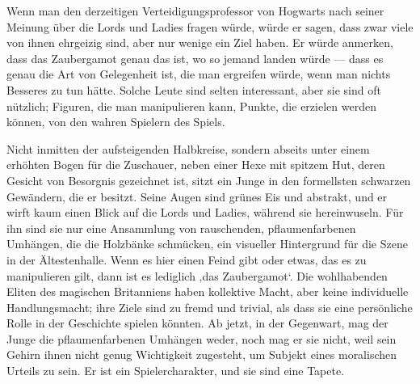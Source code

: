 Wenn man den derzeitigen Verteidigungsprofessor von Hogwarts nach seiner Meinung über die Lords und Ladies fragen würde, würde er sagen, dass zwar viele von ihnen ehrgeizig sind, aber nur wenige ein Ziel haben. Er würde anmerken, dass das Zaubergamot genau das ist, wo so jemand landen würde — dass es genau die Art von Gelegenheit ist, die man ergreifen würde, wenn man nichts Besseres zu tun hätte. Solche Leute sind selten interessant, aber sie sind oft nützlich; Figuren, die man manipulieren kann, Punkte, die erzielen werden können, von den wahren Spielern des Spiels.

Nicht inmitten der aufsteigenden Halbkreise, sondern abseits unter einem erhöhten Bogen für die Zuschauer, neben einer Hexe mit spitzem Hut, deren Gesicht von Besorgnis gezeichnet ist, sitzt ein Junge in den formellsten schwarzen Gewändern, die er besitzt. Seine Augen sind grünes Eis und abstrakt, und er wirft kaum einen Blick auf die Lords und Ladies, während sie hereinwuseln. Für ihn sind sie nur eine Ansammlung von rauschenden, pflaumenfarbenen Umhängen, die die Holzbänke schmücken, ein visueller Hintergrund für die Szene in der Ältestenhalle. Wenn es hier einen Feind gibt oder etwas, das es zu manipulieren gilt, dann ist es lediglich ‚das Zaubergamot‘. Die wohlhabenden Eliten des magischen Britanniens haben kollektive Macht, aber keine individuelle Handlungsmacht; ihre Ziele sind zu fremd und trivial, als dass sie eine persönliche Rolle in der Geschichte spielen könnten. Ab jetzt, in der Gegenwart, mag der Junge die pflaumenfarbenen Umhängen weder, noch mag er sie nicht, weil sein Gehirn ihnen nicht genug Wichtigkeit zugesteht, um Subjekt eines moralischen Urteils zu sein. Er ist ein Spielercharakter, und sie sind eine Tapete.

